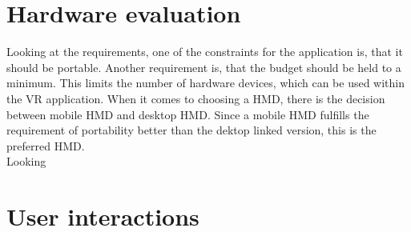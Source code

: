 \section{Hardware evaluation}
Looking at the requirements, one of the constraints for the application is, that it should be portable. Another requirement is, that the budget should be held to a minimum. This limits the number of hardware devices, which can be used within the VR application. When it comes to choosing a HMD, there is the decision between mobile HMD and desktop HMD. Since a mobile HMD fulfills the requirement of portability better than the dektop linked version, this is the preferred HMD.\\
Looking
\section{User interactions}


